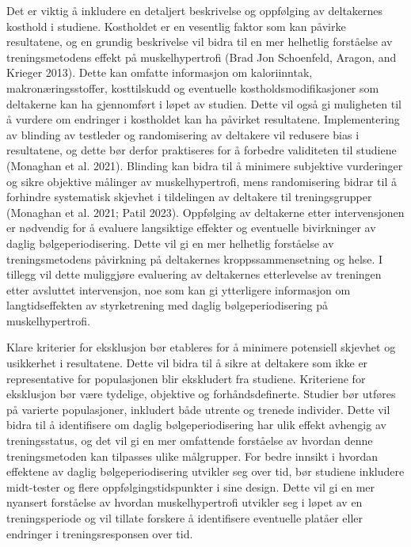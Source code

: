 \documentclass[
  letterpaper,
  DIV=11,
  numbers=noendperiod]{scrreprt}
\begin{document}
Det er viktig å inkludere en detaljert beskrivelse og oppfølging av
deltakernes kosthold i studiene. Kostholdet er en vesentlig faktor som
kan påvirke resultatene, og en grundig beskrivelse vil bidra til en mer
helhetlig forståelse av treningsmetodens effekt på muskelhypertrofi
(Brad Jon Schoenfeld, Aragon, and Krieger 2013). Dette kan omfatte
informasjon om kaloriinntak, makronæringsstoffer, kosttilskudd og
eventuelle kostholdsmodifikasjoner som deltakerne kan ha gjennomført i
løpet av studien. Dette vil også gi muligheten til å vurdere om
endringer i kostholdet kan ha påvirket resultatene. Implementering av
blinding av testleder og randomisering av deltakere vil redusere bias i
resultatene, og dette bør derfor praktiseres for å forbedre validiteten
til studiene (Monaghan et al. 2021). Blinding kan bidra til å minimere
subjektive vurderinger og sikre objektive målinger av muskelhypertrofi,
mens randomisering bidrar til å forhindre systematisk skjevhet i
tildelingen av deltakere til treningsgrupper (Monaghan et al. 2021;
Patil 2023). Oppfølging av deltakerne etter intervensjonen er nødvendig
for å evaluere langsiktige effekter og eventuelle bivirkninger av daglig
bølgeperiodisering. Dette vil gi en mer helhetlig forståelse av
treningsmetodens påvirkning på deltakernes kroppssammensetning og helse.
I tillegg vil dette muliggjøre evaluering av deltakernes etterlevelse av
treningen etter avsluttet intervensjon, noe som kan gi ytterligere
informasjon om langtidseffekten av styrketrening med daglig
bølgeperiodisering på muskelhypertrofi.

Klare kriterier for eksklusjon bør etableres for å minimere potensiell
skjevhet og usikkerhet i resultatene. Dette vil bidra til å sikre at
deltakere som ikke er representative for populasjonen blir ekskludert
fra studiene. Kriteriene for eksklusjon bør være tydelige, objektive og
forhåndsdefinerte. Studier bør utføres på varierte populasjoner,
inkludert både utrente og trenede individer. Dette vil bidra til å
identifisere om daglig bølgeperiodisering har ulik effekt avhengig av
treningsstatus, og det vil gi en mer omfattende forståelse av hvordan
denne treningsmetoden kan tilpasses ulike målgrupper. For bedre innsikt
i hvordan effektene av daglig bølgeperiodisering utvikler seg over tid,
bør studiene inkludere midt-tester og flere oppfølgingstidspunkter i
sine design. Dette vil gi en mer nyansert forståelse av hvordan
muskelhypertrofi utvikler seg i løpet av en treningsperiode og vil
tillate forskere å identifisere eventuelle platåer eller endringer i
treningsresponsen over tid.
\end{document}
